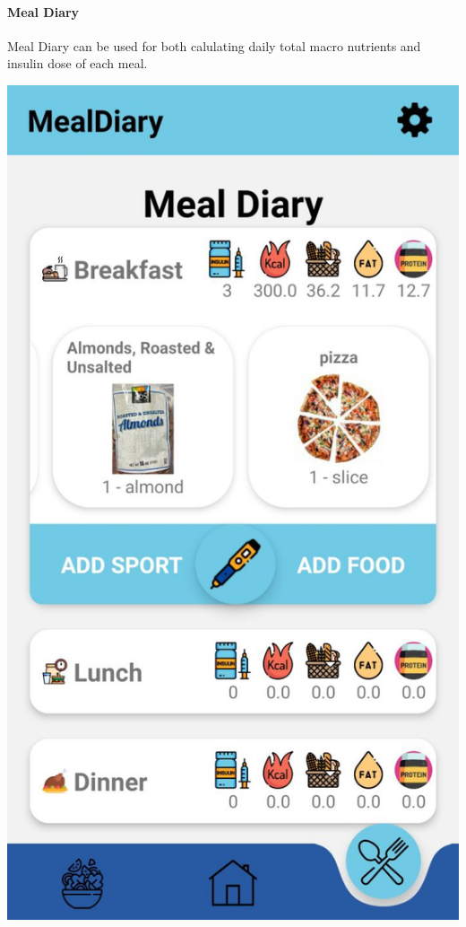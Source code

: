 \documentclass[12pt,hidelinks]{article}
\begin{document}
	\paragraph{Meal Diary}
    Meal Diary can be used for both calulating daily total macro nutrients and insulin dose of each meal. 
	\begin{center}

		\includegraphics[scale=0.2]{screenshot5}
	\end{center}
\end{document}
